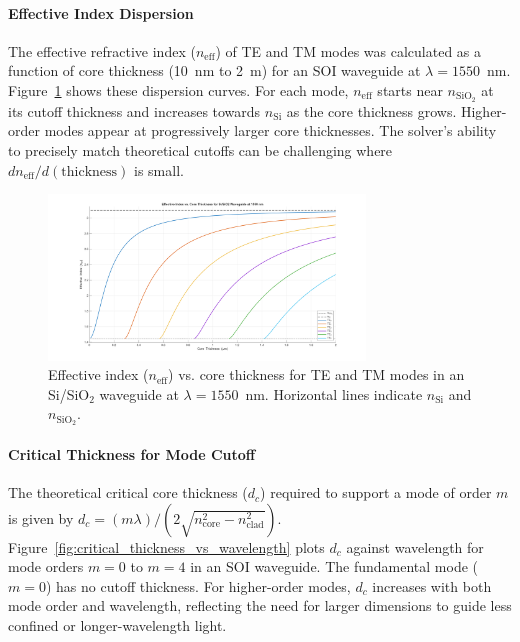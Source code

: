 \documentclass[10pt, a4paper]{article}
\begin{document}
\paragraph{Effective Index Dispersion}
The effective refractive index ($n_{\text{eff}}$) of TE and TM modes was calculated as a function of core thickness (10~nm to 2~{\textmu}m) for an SOI waveguide at $\lambda = 1550$~nm. Figure~\ref{fig:neff_vs_thickness_Si_SiO2_1550nm} shows these dispersion curves. For each mode, $n_{\text{eff}}$ starts near $n_{\text{SiO}_2}$ at its cutoff thickness and increases towards $n_{\text{Si}}$ as the core thickness grows. Higher-order modes appear at progressively larger core thicknesses. The solver's ability to precisely match theoretical cutoffs can be challenging where $dn_{\text{eff}}/d(\text{thickness})$ is small.

\begin{figure}[h!]
    \centering
    \includegraphics[width=0.75\textwidth]{task1/neff_vs_thickness_Si_SiO2_1550nm.png}
    \caption{Effective index ($n_{\text{eff}}$) vs. core thickness for TE and TM modes in an Si/SiO$_2$ waveguide at $\lambda = 1550$~nm. Horizontal lines indicate $n_{\text{Si}}$ and $n_{\text{SiO}_2}$.}
    \label{fig:neff_vs_thickness_Si_SiO2_1550nm}
\end{figure}

\paragraph{Critical Thickness for Mode Cutoff}
The theoretical critical core thickness ($d_c$) required to support a mode of order $m$ is given by $d_c = (m \lambda) / (2 \sqrt{n_{\text{core}}^2 - n_{\text{clad}}^2})$. Figure~\ref{fig:critical_thickness_vs_wavelength} plots $d_c$ against wavelength for mode orders $m=0$ to $m=4$ in an SOI waveguide. The fundamental mode ($m=0$) has no cutoff thickness. For higher-order modes, $d_c$ increases with both mode order and wavelength, reflecting the need for larger dimensions to guide less confined or longer-wavelength light.
\end{document}
